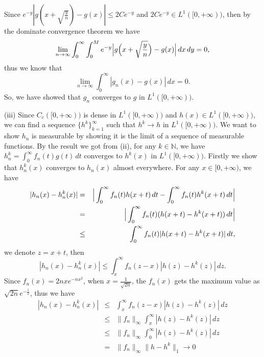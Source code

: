\documentclass[12pt]{article}
\begin{document}
Since $e^{-y} | g ( x + \sqrt{\frac{y}{n}} )  - g(x) | \leq 2 C e^{-y}$ and $2 C e^{-y} \in L^{1}([0, + \infty))$, then by the dominate convergence theorem we have
\begin{equation*}
    \lim_{n \to \infty}  \int_{0}^{\infty} \int_{0}^{M}  e^{-y} \Big{|} g \Big{(} x + \sqrt{\frac{y}{n}} \Big{)}  - g(x) \Big{|} \, d x \, d y = 0,
\end{equation*}
thus we know that 
\begin{equation*}
    \lim_{n \to \infty} \int_{0}^{\infty} |g_{n}(x) - g(x)| \, d x  = 0.
\end{equation*}
So, we have showed that $g_{n}$ converges to $g$ in $L^{1}([0, + \infty))$.

\vspace{8pt}

(iii) Since $C_{c}([0, + \infty))$ is dense in $L^{1}([0, + \infty))$ and $h(x) \in L^{1}([0, + \infty))$, we can find a sequence $\{h^{k}\}_{k = 1}^{\infty}$ such that $h^{k} \to h$ in $L^{1}([0, + \infty))$. We want to show $h_{n}$ is measurable by showing it is the limit of a sequence of measurable functions. By the result we got from (ii), for any $k \in \mathbb{N}$, we have $h_{n}^{k} = \int_{0}^{\infty} f_{n}(t) g(t) \, d t$ converges to $h^{k}(x)$ in $L^{1}([0, + \infty))$. Firstly we show that $h_{n}^{k} (x)$ converges to $h_{n} (x)$ almost everywhere. For any $x \in [0, + \infty)$, we have
\begin{eqnarray*}
|h_{n}(x) - h_{n}^{k} (x)|  & = & \Big{|} \int_{0}^{\infty} f_{n} (t) h(x + t) \, d t - \int_{0}^{\infty} f_{n} (t) h^{k}(x + t) \, d t \Big{|} \\
 & = & \Big{|} \int_{0}^{\infty} f_{n} (t) ( h(x + t) - h^{k}(x + t)) \, d t \Big{|} \\
 & \leq & \int_{0}^{\infty} f_{n} (t) | h(x + t) - h^{k}(x + t)| \, d t,
\end{eqnarray*}
we denote $z = x + t$, then
\begin{equation*}
    |h_{n}(x) - h_{n}^{k} (x)| \leq \int_{x}^{\infty} f_{n} (z - x) | h(z) - h^{k}(z)| \, d z.
\end{equation*}
Since $f_{n}(x) = 2 n x e^{-n x^{2}}$, when $x = \frac{1}{\sqrt{2n}}$, the $f_{n}(x)$ gets the maximum value as $\sqrt{2n} e^{-\frac{1}{2}}$, thus we have
\begin{eqnarray*}
|h_{n}(x) - h_{n}^{k} (x)|  & \leq & \int_{x}^{\infty} f_{n} (z - x) | h(z) - h^{k}(z)| \, d z \\
 & \leq  & \|f_{n}\|_{\infty} \int_{x}^{\infty} |h(z) - h^{k} (z)| \, d z \\
 & \leq & \|f_{n}\|_{\infty} \int_{0}^{\infty} |h(z) - h^{k} (z)| \, d z \\
 & = & \|f_{n}\|_{\infty}  \|h - h^{k}\|_{1} \to 0
\end{eqnarray*}
\end{document}
